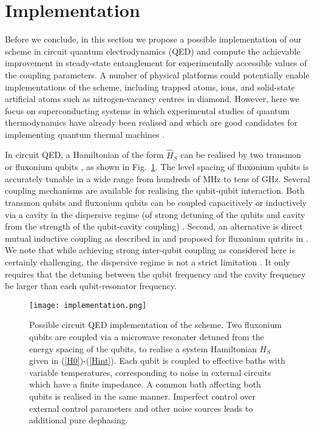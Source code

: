 \documentclass[12pt]{iopart}
\begin{document}
\section{Implementation}

Before we conclude, in this section we propose a possible implementation of our scheme in circuit quantum electrodynamics (QED) and compute the achievable improvement in steady-state entanglement for experimentally accessible values of the coupling parameters. A number of physical platforms could potentially enable implementations of the scheme, including trapped atoms, ions, and solid-state artificial atoms such as nitrogen-vacancy centres in diamond. However, here we focus on superconducting systems in which experimental studies of quantum thermodynamics have already been realised \cite{Cottet2017,Koski2013,Koski2014,Pekola2015} and which are good candidates for implementing quantum thermal machines \cite{Brask2015,Chen2012,Hofer2016a,Hofer2016b,Tavakoli2017}.

In circuit QED, a Hamiltonian of the form $\hat{H}_{S}$ can be realised by two transmon or fluxonium qubits \cite{Manucharyan2012}, as shown in Fig.~\ref{fig.implementation}. The level spacing of fluxonium qubits is accurately tunable in a wide range from hundreds of MHz to tens of GHz. Several coupling mechanisms are available for realising the qubit-qubit interaction. Both transmon qubits \cite{Majer2007,Sillanpaa2007,DiCarlo2009} and fluxonium qubits can be coupled capacitively or inductively via a cavity in the dispersive regime (of strong detuning of the qubits and cavity from the strength of the qubit-cavity coupling) \cite{Manucharyan2012}. Second, an alternative is direct mutual inductive coupling as described in \cite{Chen2014} and proposed for fluxonium qutrits in \cite{Manucharyan2012}. We note that while achieving strong inter-qubit coupling as considered here is certainly challenging, the dispersive regime is not a strict limitation  \cite{Filipp2011,Kim2015}. It only requires that the detuning between the qubit frequency and the cavity frequency be larger than each qubit-resonator frequency.


\begin{figure}[tbp]
\centering
\texttt{[image: implementation.png]}
\caption{Possible circuit QED implementation of the scheme. Two fluxonium qubits are coupled via a microwave resonater detuned from the energy spacing of the qubits, to realise a system Hamiltonian $H_{S}$ given in (\ref{H0})-(\ref{Hint}). Each qubit is coupled to effective baths with variable temperatures, corresponding to noise in external circuits which have a finite impedance. A common bath affecting both qubits is realised in the same manner. Imperfect control over external control parameters and other noise sources leads to additional pure dephasing.}
\label{fig.implementation}
\end{figure}
\end{document}
